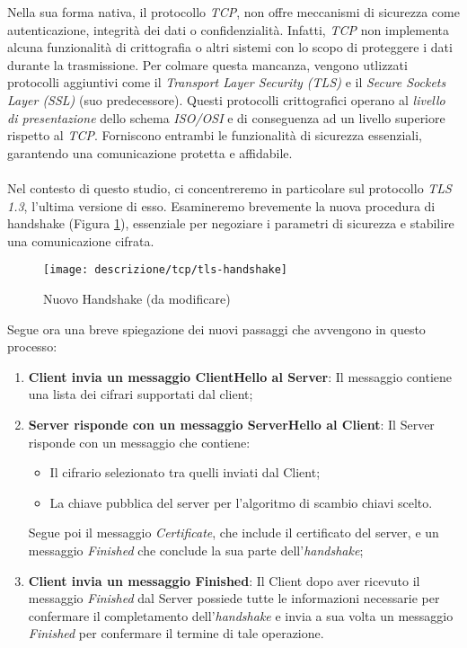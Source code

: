 \noindent Nella sua forma nativa, il protocollo \emph{TCP}, non offre meccanismi di sicurezza come autenticazione, integrità dei dati o confidenzialità. Infatti, \emph{TCP} non implementa alcuna funzionalità di crittografia o altri sistemi con lo scopo di proteggere i dati durante la trasmissione.
Per colmare questa mancanza, vengono utlizzati protocolli aggiuntivi come il \emph{Transport Layer Security (TLS)} e il \emph{Secure Sockets Layer (SSL)} (suo predecessore). Questi protocolli crittografici operano al \emph{livello di presentazione \glsfirstoccur} dello schema \emph{ISO/OSI \glsfirstoccur} e di conseguenza ad un livello superiore rispetto al \emph{TCP}.
Forniscono entrambi le funzionalità di sicurezza essenziali, garantendo una comunicazione protetta e affidabile.
\\\\
Nel contesto di questo studio, ci concentreremo in particolare sul protocollo \emph{TLS 1.3}, l'ultima versione di esso. Esamineremo brevemente la nuova procedura di handshake (Figura \ref{tlsHand}), essenziale per negoziare i parametri di sicurezza e stabilire una comunicazione cifrata.
\begin{figure}[!h]
    \centering
    \texttt{[image: descrizione/tcp/tls-handshake]}
    \caption{Nuovo Handshake (da modificare)}
    \label{tlsHand}
\end{figure}

\noindent Segue ora una breve spiegazione dei nuovi passaggi che avvengono in questo processo:
\begin{enumerate}
    \item \textbf{Client invia un messaggio ClientHello al Server}: Il messaggio contiene una lista dei cifrari supportati dal client;
    \item \textbf{Server risponde con un messaggio ServerHello al Client}: Il Server risponde con un messaggio che contiene: 
    \begin{itemize}
        \item  Il cifrario selezionato tra quelli inviati dal Client;
        \item  La chiave pubblica del server per l'algoritmo di scambio chiavi scelto.
    \end{itemize}
    Segue poi il messaggio \emph{Certificate}, che include il certificato del server, e un messaggio \emph{Finished} che conclude la sua parte dell'\emph{handshake};
    \item \textbf{Client invia un messaggio Finished}: Il Client dopo aver ricevuto il messaggio \emph{Finished} dal Server possiede tutte le informazioni necessarie per confermare il completamento dell'\emph{handshake} e invia a sua volta un messaggio \emph{Finished} per confermare il termine di tale operazione.
\end{enumerate}

